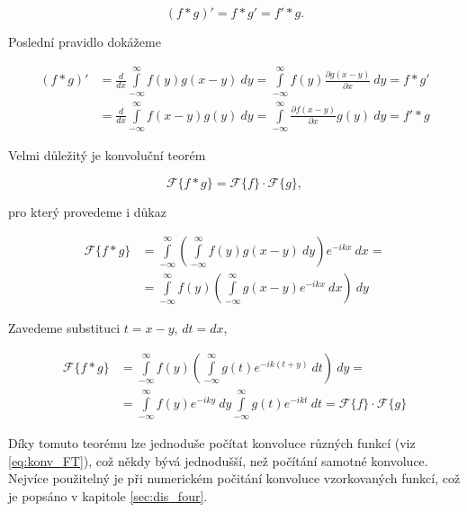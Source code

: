 \begin{equation}
(f \ast g)' = f \ast g' = f' \ast g.
\end{equation}

Poslední pravidlo dokážeme

\begin{equation}
\begin{aligned}
(f \ast g)' & = \frac{d}{dx} \int\limits_{-\infty}^{\infty} f(y) g(x-y)~ dy = \int\limits_{-\infty}^{\infty} f(y) \frac{\partial g(x-y)}{\partial x} ~dy = f \ast g' \\
&= \frac{d}{dx} \int\limits_{-\infty}^{\infty} f(x-y) g(y)~ dy = \int\limits_{-\infty}^{\infty} \frac{\partial f(x-y)}{\partial x} g(y)~ dy = f' \ast g
\end{aligned}
\end{equation}

Velmi důležitý je konvoluční teorém

\begin{equation}\label{eq:konvolucni_teorem}
\mathscr{F}\{f \ast g\} = \mathscr{F}\{ f \} \cdot \mathscr{F}\{ g \},
\end{equation}

pro který provedeme i důkaz

\begin{equation}
\begin{aligned}
\mathscr{F}\{f \ast g\} & = \int\limits_{-\infty}^{\infty} \left( \int\limits_{-\infty}^{\infty} f(y) g(x-y) ~dy \right) e^{-ikx}~ dx = \\
& = \int\limits_{-\infty}^{\infty}  f(y) \left( \int\limits_{-\infty}^{\infty} g(x-y) e^{-ikx}~ dx \right) ~dy
\end{aligned}
\end{equation}

Zavedeme substituci $t = x-y$, $dt=dx$,

\begin{equation}
\begin{aligned}
\mathscr{F}\{f \ast g\} & = \int\limits_{-\infty}^{\infty}  f(y) \left( \int\limits_{-\infty}^{\infty} g(t) e^{-ik(t+y)} ~dt \right)~ dy = \\
& = \int\limits_{-\infty}^{\infty}  f(y) e^{-iky}~ dy \int\limits_{-\infty}^{\infty} g(t) e^{-ikt}~dt = \mathscr{F}\{f\} \cdot \mathscr{F}\{g\}
\end{aligned}
\end{equation} 

Díky tomuto teorému lze jednoduše počítat konvoluce různých funkcí (viz \eqref{eq:konv_FT}), což někdy bývá jednodušší, než počítání samotné konvoluce. Nejvíce použitelný je při numerickém počitání konvoluce vzorkovaných funkcí, což je popsáno v kapitole \ref{sec:dis_four}.


